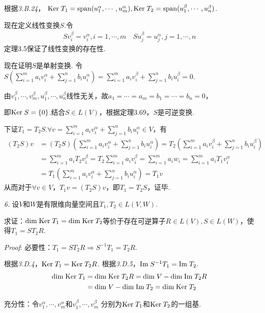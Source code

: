 根据\textit{3.B.24}，
$\mathrm{Ker \;} T_1=\mathrm{span} (u_1^\alpha,\cdots,u_m^\alpha),\mathrm{Ker \;} T_2=\mathrm{span} (u_1^\beta,\cdots,u_n^\beta)$.

现在定义线性变换$S$.令
    \begin{align*}
        Sv_i^\beta=v_i^\alpha,i=1,\cdots,m \quad
        Su_j^\beta=u_j^\alpha,j=1,\cdots,n
    \end{align*}
定理3.5保证了线性变换的存在性.

现在证明$S$是单射变换.
令$S(\sum_{i=1}^m a_iv_i^\alpha+\sum_{j=1}^n b_iu_i^\alpha)=\sum_{i=1}^m a_iv_i^\beta+\sum_{j=1}^n b_iu_i^\beta=0$.

由$v_1^\beta,\cdots,v_m^\beta,u_1^\beta,\cdots,u_n^\beta$线性无关，故$a_1=\cdots=a_m=b_1=\cdots=b_n=0$，

即$\mathrm{Ker \;} S=\{0\}$.结合$S \in L(V)$，根据定理3.69，$S$是可逆变换.

下证$T_1=T_2S$.$\forall v=\sum_{i=1}^m a_iv_i^\alpha+\sum_{j=1}^n b_iu_i^\alpha \in V$，有
    \begin{align*}
        (T_2S)v&=(T_2S)(\sum_{i=1}^m a_iv_i^\alpha+\sum_{j=1}^n b_iu_i^\alpha )
                =T_2(\sum_{i=1}^m a_iv_i^\beta+\sum_{j=1}^n b_iu_i^\beta ) \\
            &=\sum_{i=1}^m a_iT_2v_i^\beta=T_2\sum_{i=1}^m a_iv_i^\beta
                =\sum_{i=1}^m a_iw_i=\sum_{i=1}^m a_iT_1v_i^\alpha \\
            &=T_1(\sum_{i=1}^m a_iv_i^\alpha+\sum_{j=1}^n b_iu_i^\alpha)=T_1v
    \end{align*}
从而对于$\forall v \in V$，$T_1v=(T_2S)v$，即$T_1=T_2S$，证毕.

\newpage

\textit{6.}
设$V$和$W$是有限维向量空间且$T_1,T_2 \in L(V,W)$.

求证：$\mathrm{dim \;} \mathrm{Ker \;} T_1=\mathrm{dim \;} \mathrm{Ker \;} T_2$等价于存在可逆算子$R \in L(V),S \in L(W)$，使得$T_1=ST_2R$.

\textit{Proof}:
必要性：$T_1=ST_2R \Rightarrow S^{-1}T_1=T_2R$.

根据\textit{3.D.4}，$\mathrm{Ker \;} T_1=\mathrm{Ker \;} T_2R$.
根据\textit{3.D.5}，$\mathrm{Im \;} S^{-1}T_1=\mathrm{Im \;} T_2$.
    \begin{align*}
        \mathrm{dim \;} \mathrm{Ker \;} T_1 &=\mathrm{dim \;} \mathrm{Ker \;} T_2R=\mathrm{dim \;} V-\mathrm{dim \;} \mathrm{Im \;} T_2R \\
        &=\mathrm{dim \;} V-\mathrm{dim \;} \mathrm{Im \;} T_2=\mathrm{dim \;} \mathrm{Ker \;} T_2
    \end{align*}

充分性：令$v_1^\alpha,\cdots,v_m^\alpha$和$v_1^\beta,\cdots,v_m^\beta$
分别为$\mathrm{Ker \;} T_1$和$\mathrm{Ker \;} T_2$的一组基.

